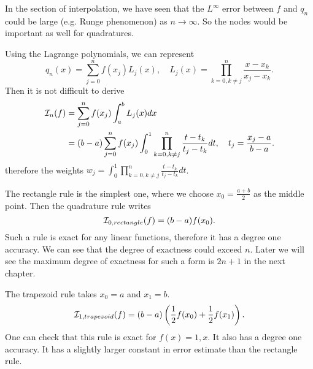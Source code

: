 \begin{remark}
    In the section of interpolation, we have seen that the $L^{\infty}$ error between $f$ and $q_n$ could be large (e.g. Runge phenomenon) as $n\to \infty$. So the nodes would be important as well for quadratures.
\end{remark}
Using the Lagrange polynomials, we can represent 
\begin{equation}
    q_n(x) = \sum_{j=0}^n f(x_j) L_j(x),\quad L_j(x) = \prod_{k=0, k\neq j}^n \frac{x - x_k}{x_j - x_k}. 
\end{equation}
Then it is not difficult to derive
\begin{equation}
    \begin{aligned}
        \mathcal I_n(f)& = \sum_{j=0}^n f(x_j) \int_a^b L_j(x) dx  \\ &=(b-a) \sum_{j=0}^n f(x_j) \int_0^1 \prod_{k=0, k\neq j }^n \frac{t - t_k}{t_j - t_k} dt, \quad t_j = \frac{x_j - a}{b-a}.   
    \end{aligned}
\end{equation}
therefore the weights $w_j =  \int_0^1 \prod_{k=0, k\neq j }^n \frac{t - t_k}{t_j - t_k} dt$. 

\begin{example}
   The rectangle rule is the simplest one, where we choose $x_0 = \frac{a+b}{2}$ as the middle point. Then the quadrature rule writes
   $$\mathcal I_{0, rectangle}(f)  = (b-a) f(x_0). $$
  Such a rule is exact for any linear functions, therefore it has a degree one accuracy. We can see that the degree of exactness could exceed $n$. Later we will see the maximum degree of exactness for such a form is $2n+1$ in the next chapter.
\end{example}

\begin{example}
The trapezoid rule takes $x_0 = a$ and $x_1= b$. 
$$\mathcal I_{1,trapezoid} (f) = (b-a)\left( \frac{1}{2} f(x_0) + \frac{1}{2} f(x_1) \right).$$
One can check that this rule is exact for $f(x) = 1, x$. It also has a degree one accuracy. It has a slightly larger constant in error estimate than the rectangle rule.
\end{example}


